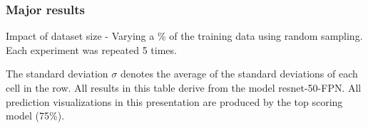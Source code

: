 \documentclass[aspectratio=1610]{beamer}
\begin{document}
\begin{frame}
  \frametitle{Major results}
  Impact of dataset size - Varying a \% of the training data using random sampling. Each experiment was repeated 5 times.

  \begin{table}[H]
  \begin{center}
    \caption{Gradually increasing dataset size - 6 classes - In-domain test set}
    \label{tab:dsizeallcinset}
  \end{center}
\end{table}
The standard deviation $\sigma$ denotes the average of the standard deviations of each cell in the
row. All results in this table derive from the model resnet-50-FPN. All prediction visualizations in this presentation are produced by the top scoring model (75\%).

\end{frame}
\normalpage
\end{document}

